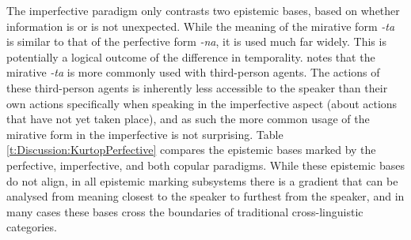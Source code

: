 The imperfective paradigm only contrasts two epistemic bases, based on whether information is or is not unexpected. While the meaning of the mirative form \textit{-ta} is similar to that of the perfective form \textit{-na}, it is used much far widely. This is potentially a logical outcome of the difference in temporality.  notes that the mirative \textit{-ta} is more commonly used with third-person agents. The actions of these third-person agents is inherently less accessible to the speaker than their own actions specifically when speaking in the imperfective aspect (about actions that have not yet taken place), and as such the more common usage of the mirative form in the imperfective is not surprising. Table \ref{t:Discussion:KurtopPerfective} compares the epistemic bases marked by the perfective, imperfective, and both copular paradigms. While these epistemic bases do not align, in all epistemic marking subsystems there is a gradient that can be analysed from meaning closest to the speaker to furthest from the speaker, and in many cases these bases cross the boundaries of traditional cross-linguistic categories.

